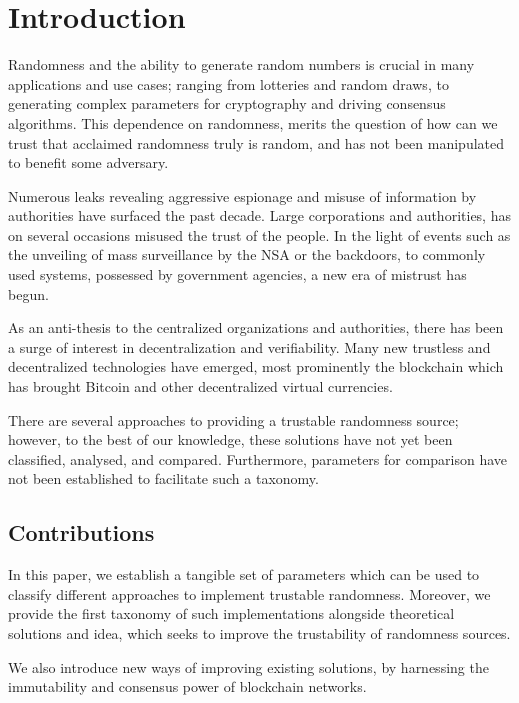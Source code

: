 \section{Introduction}\label{cha:introduction}

Randomness and the ability to generate random numbers is crucial in many applications and use cases;
ranging from lotteries and random draws, to generating complex parameters for cryptography and driving consensus algorithms.
This dependence on randomness, merits the question of how can we trust that acclaimed randomness truly is random, and has not been manipulated to benefit some adversary.

Numerous leaks revealing aggressive espionage and misuse of information by authorities have surfaced the past decade.
Large corporations and authorities, has on several occasions misused the trust of the people.
In the light of events such as the unveiling of mass surveillance by the NSA or the backdoors, to commonly used systems, possessed by government agencies, a new era of mistrust has begun.

As an anti-thesis to the centralized organizations and authorities, there has been a surge of interest in decentralization and verifiability.
Many new trustless and decentralized technologies have emerged, most prominently the blockchain which has brought Bitcoin and other decentralized virtual currencies.

There are several approaches to providing a trustable randomness source; however, to the best of our knowledge, these solutions have not yet been classified, analysed, and compared.
Furthermore, parameters for comparison have not been established to facilitate such a taxonomy.

\subsection*{Contributions}\label{subsec:contributions}
In this paper, we establish a tangible set of parameters which can be used to classify different approaches to implement trustable randomness.
Moreover, we provide the first taxonomy of such implementations alongside theoretical solutions and idea, which seeks to improve the trustability of randomness sources.

We also introduce new ways of improving existing solutions, by harnessing the immutability and consensus power of blockchain networks.


